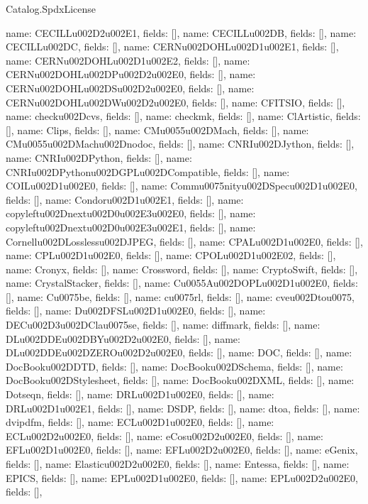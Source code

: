 \begin{lexlean}{Catalog.SpdxLicense}
\begin{semanticmodule}
{    {name: CECILLu002D2u002E1, fields: []},
    {name: CECILLu002DB, fields: []},
    {name: CECILLu002DC, fields: []},
    {name: CERNu002DOHLu002D1u002E1, fields: []},
    {name: CERNu002DOHLu002D1u002E2, fields: []},
    {name: CERNu002DOHLu002DPu002D2u002E0, fields: []},
    {name: CERNu002DOHLu002DSu002D2u002E0, fields: []},
    {name: CERNu002DOHLu002DWu002D2u002E0, fields: []},
    {name: CFITSIO, fields: []},
    {name: checku002Dcvs, fields: []},
    {name: checkmk, fields: []},
    {name: ClArtistic, fields: []},
    {name: Clips, fields: []},
    {name: CMu0055u002DMach, fields: []},
    {name: CMu0055u002DMachu002Dnodoc, fields: []},
    {name: CNRIu002DJython, fields: []},
    {name: CNRIu002DPython, fields: []},
    {name: CNRIu002DPythonu002DGPLu002DCompatible, fields: []},
    {name: COILu002D1u002E0, fields: []},
    {name: Commu0075nityu002DSpecu002D1u002E0, fields: []},
    {name: Condoru002D1u002E1, fields: []},
    {name: copyleftu002Dnextu002D0u002E3u002E0, fields: []},
    {name: copyleftu002Dnextu002D0u002E3u002E1, fields: []},
    {name: Cornellu002DLosslessu002DJPEG, fields: []},
    {name: CPALu002D1u002E0, fields: []},
    {name: CPLu002D1u002E0, fields: []},
    {name: CPOLu002D1u002E02, fields: []},
    {name: Cronyx, fields: []},
    {name: Crossword, fields: []},
    {name: CryptoSwift, fields: []},
    {name: CrystalStacker, fields: []},
    {name: Cu0055Au002DOPLu002D1u002E0, fields: []},
    {name: Cu0075be, fields: []},
    {name: cu0075rl, fields: []},
    {name: cveu002Dtou0075, fields: []},
    {name: Du002DFSLu002D1u002E0, fields: []},
    {name: DECu002D3u002DClau0075se, fields: []},
    {name: diffmark, fields: []},
    {name: DLu002DDEu002DBYu002D2u002E0, fields: []},
    {name: DLu002DDEu002DZEROu002D2u002E0, fields: []},
    {name: DOC, fields: []},
    {name: DocBooku002DDTD, fields: []},
    {name: DocBooku002DSchema, fields: []},
    {name: DocBooku002DStylesheet, fields: []},
    {name: DocBooku002DXML, fields: []},
    {name: Dotseqn, fields: []},
    {name: DRLu002D1u002E0, fields: []},
    {name: DRLu002D1u002E1, fields: []},
    {name: DSDP, fields: []},
    {name: dtoa, fields: []},
    {name: dvipdfm, fields: []},
    {name: ECLu002D1u002E0, fields: []},
    {name: ECLu002D2u002E0, fields: []},
    {name: eCosu002D2u002E0, fields: []},
    {name: EFLu002D1u002E0, fields: []},
    {name: EFLu002D2u002E0, fields: []},
    {name: eGenix, fields: []},
    {name: Elasticu002D2u002E0, fields: []},
    {name: Entessa, fields: []},
    {name: EPICS, fields: []},
    {name: EPLu002D1u002E0, fields: []},
    {name: EPLu002D2u002E0, fields: []},
}
\end{semanticmodule}
\end{lexlean}
